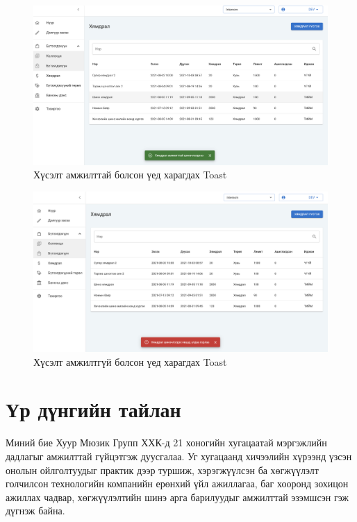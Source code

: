 \begin{figure}
	\centering
	\includegraphics[width=15cm]{images/toast-success.png}
	\caption{Хүсэлт амжилттай болсон үед харагдах Toast}
	\label{fig:toast}
\end{figure}

\begin{figure}
	\centering
	\includegraphics[width=15cm]{images/toast-failed.png}
	\caption{Хүсэлт амжилтгүй болсон үед харагдах Toast}
	\label{fig:toast}
\end{figure}

\pagebreak
\section{Үр дүнгийн тайлан}
Миний бие Хуур Мюзик Групп ХХК-д 21 хоногийн хугацаатай мэргэжлийн дадлагыг амжилттай гүйцэтгэж дуусгалаа. Уг хугацаанд хичээлийн хүрээнд үзсэн онолын ойлголтуудыг практик дээр туршиж, хэрэгжүүлсэн ба хөгжүүлэлт голчилсон технологийн компанийн ерөнхий үйл ажиллагаа, баг хооронд зохицон ажиллах чадвар, хөгжүүлэлтийн шинэ арга барилуудыг амжилттай эзэмшсэн гэж дүгнэж байна.

